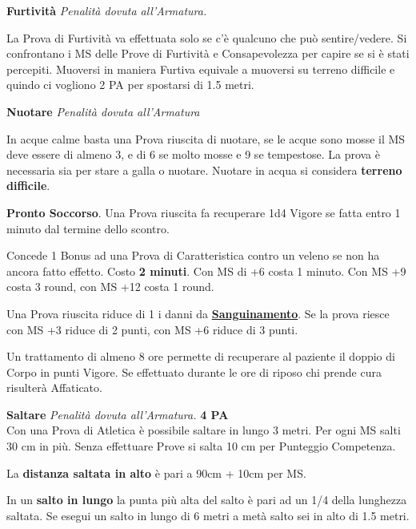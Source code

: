 \documentclass[12pt,a4paper,twoside,openany]{book}
\begin{document}
\begin{multicols}{2}
\medskip

\textbf{Furtività}  \textit{Penalità dovuta all'Armatura.}

La Prova di Furtività va effettuata solo se c'è qualcuno che può sentire/vedere. Si confrontano i MS delle Prove di Furtività e Consapevolezza per capire se si è stati percepiti. Muoversi in maniera Furtiva equivale a muoversi su terreno difficile e quindo ci vogliono 2 PA per spostarsi di 1.5 metri.

\medskip

\textbf{Nuotare} \textit{Penalità dovuta all'Armatura}

In acque calme basta una Prova riuscita di nuotare, se le acque sono mosse il MS deve essere di almeno 3, e di 6 se molto mosse e 9 se tempestose. La prova è necessaria sia per stare a galla o nuotare. Nuotare in acqua si considera \textbf{terreno difficile}.

\medskip

\textbf{Pronto Soccorso}\hypertarget{prontosoccorso}{}\label{prontosoccorso}. Una Prova riuscita fa recuperare 1d4 Vigore se fatta entro 1 minuto dal termine dello scontro.

Concede 1 Bonus ad una Prova di Caratteristica contro un veleno se non ha ancora fatto effetto. Costo \textbf{2 minuti}. Con MS di +6 costa 1 minuto. Con MS +9 costa 3 round, con MS +12 costa 1 round.

Una Prova riuscita riduce di 1 i danni da \hyperlink{sanguinamento}{\textbf{Sanguinamento}}. Se la prova riesce con MS +3 riduce di 2 punti, con MS +6 riduce di 3 punti.

Un trattamento di almeno 8 ore permette di recuperare al paziente il doppio di Corpo in punti Vigore. Se effettuato durante le ore di riposo chi prende cura risulterà Affaticato.

\medskip

\textbf{Saltare} \textit{Penalità dovuta all'Armatura.} \textbf{4 PA}\\

Con una Prova di Atletica è possibile saltare in lungo 3 metri. Per ogni MS salti 30 cm in più. Senza effettuare Prove si salta 10 cm per Punteggio Competenza.

La \textbf{distanza saltata in alto} è pari a 90cm + 10cm per MS.

In un \textbf{salto in lungo} la punta più alta del salto è pari ad un 1/4 della lunghezza saltata. Se esegui un salto in lungo di 6 metri a metà salto sei in alto di 1.5 metri.


\end{multicols}
\end{document}
